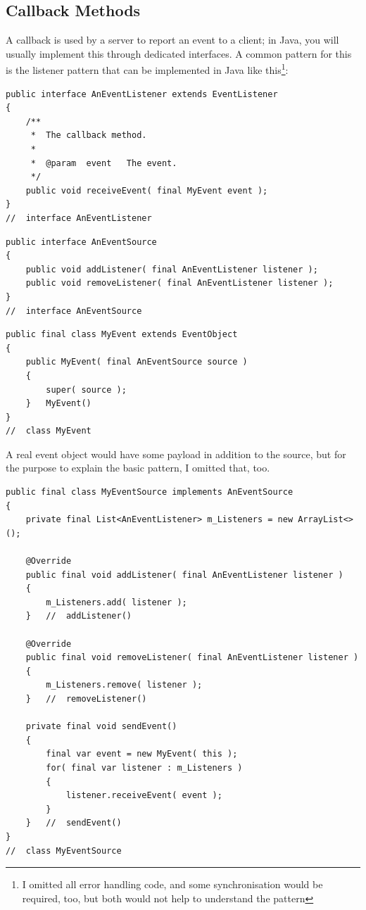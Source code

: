 
\subsection{Callback Methods}
A callback is used by a server to report an event to a client; in Java, you will usually implement this through dedicated interfaces. A common pattern for this is the listener pattern that can be implemented in Java like this\footnote{I omitted all error handling code, and some synchronisation would be required, too, but both would not help to understand the pattern}:
\begin{lstlisting}
public interface AnEventListener extends EventListener
{
    /**
     *  The callback method.
     *
     *  @param  event   The event.
     */
    public void receiveEvent( final MyEvent event );
}
//  interface AnEventListener
\end{lstlisting}

\begin{lstlisting}
public interface AnEventSource
{
    public void addListener( final AnEventListener listener );
    public void removeListener( final AnEventListener listener );
}
//  interface AnEventSource
\end{lstlisting}

\begin{lstlisting}
public final class MyEvent extends EventObject
{
    public MyEvent( final AnEventSource source )
    {
        super( source );
    }   MyEvent()
}
//  class MyEvent
\end{lstlisting}
A real event object would have some payload in addition to the source, but for the purpose to explain the basic pattern, I omitted that, too.

\begin{lstlisting}
public final class MyEventSource implements AnEventSource
{
    private final List<AnEventListener> m_Listeners = new ArrayList<>();
    
    @Override
    public final void addListener( final AnEventListener listener )
    {
        m_Listeners.add( listener );
    }   //  addListener()
    
    @Override
    public final void removeListener( final AnEventListener listener )
    {
        m_Listeners.remove( listener );
    }   //  removeListener()
    
    private final void sendEvent()
    {
        final var event = new MyEvent( this );
        for( final var listener : m_Listeners )
        {
            listener.receiveEvent( event );
        }
    }   //  sendEvent()
}
//  class MyEventSource
\end{lstlisting}

